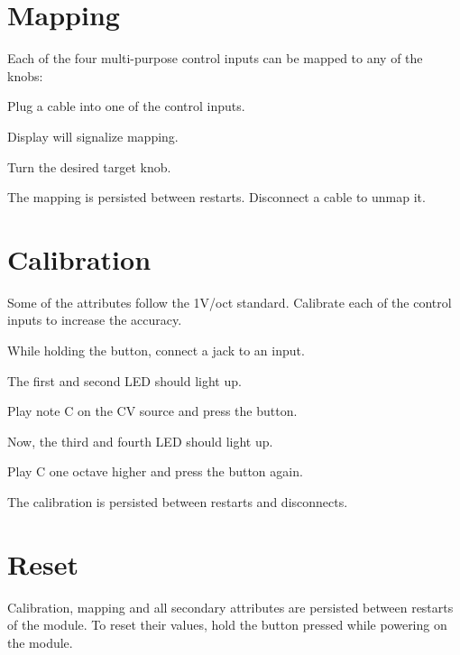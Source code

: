 \documentclass[11pt]{article}
\newenvironment{packed_enumerate}{
\begin{enumerate}
  \setlength{\itemsep}{1pt}
  \setlength{\parskip}{0pt}
  \setlength{\parsep}{0pt}
}{\end{enumerate}}
\begin{document}
\begin{minipage}{0.05\textwidth}
\phantom{ }
\end{minipage}%
\begin{minipage}[t]{0.45\textwidth}
\setlength{\parskip}{6pt}

\section{Mapping}

Each of the four multi-purpose control inputs can be mapped to any of the knobs:

\begin{packed_enumerate}
  \item Plug a cable into one of the control inputs.
  \item Display will signalize mapping.
  \item Turn the desired target knob.
\end{packed_enumerate}

The mapping is persisted between restarts. Disconnect a cable to unmap it.

\vspace{1.3cm}

\section{Calibration}

Some of the attributes follow the 1V/oct standard. Calibrate each of the control
inputs to increase the accuracy.

\begin{packed_enumerate}
  \item While holding the button, connect a jack to an input.
  \item The first and second LED should light up.
  \item Play note C on the CV source and press the button.
  \item Now, the third and fourth LED should light up.
  \item Play C one octave higher and press the button again.
\end{packed_enumerate}

The calibration is persisted between restarts and disconnects.

\vspace{1.3cm}

\section{Reset}

Calibration, mapping and all secondary attributes are persisted between restarts
of the module. To reset their values, hold the button pressed while powering on
the module.

\end{minipage}
\end{document}
